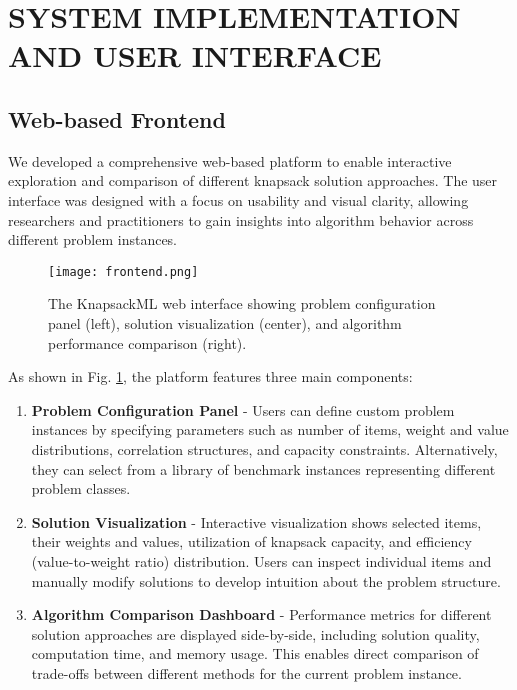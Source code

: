 \documentclass[conference, a4paper]{IEEEtran}
\begin{document}
\section{SYSTEM IMPLEMENTATION AND USER INTERFACE}
\subsection{Web-based Frontend}
We developed a comprehensive web-based platform to enable interactive exploration and comparison of different knapsack solution approaches. The user interface was designed with a focus on usability and visual clarity, allowing researchers and practitioners to gain insights into algorithm behavior across different problem instances.

\begin{figure}[htbp]
\centerline{\texttt{[image: frontend.png]}}
\caption{The KnapsackML web interface showing problem configuration panel (left), solution visualization (center), and algorithm performance comparison (right).}
\label{fig:frontend}
\end{figure}

As shown in Fig. \ref{fig:frontend}, the platform features three main components:

\begin{enumerate}
    \item \textbf{Problem Configuration Panel} - Users can define custom problem instances by specifying parameters such as number of items, weight and value distributions, correlation structures, and capacity constraints. Alternatively, they can select from a library of benchmark instances representing different problem classes.
    
    \item \textbf{Solution Visualization} - Interactive visualization shows selected items, their weights and values, utilization of knapsack capacity, and efficiency (value-to-weight ratio) distribution. Users can inspect individual items and manually modify solutions to develop intuition about the problem structure.
    
    \item \textbf{Algorithm Comparison Dashboard} - Performance metrics for different solution approaches are displayed side-by-side, including solution quality, computation time, and memory usage. This enables direct comparison of trade-offs between different methods for the current problem instance.
\end{enumerate}
\end{document}
